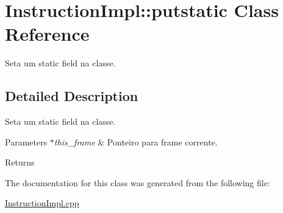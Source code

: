 \hypertarget{class_instruction_impl_1_1putstatic}{}\section{Instruction\+Impl\+:\+:putstatic Class Reference}
\label{class_instruction_impl_1_1putstatic}


Seta um static field na classe.  




\subsection{Detailed Description}
Seta um static field na classe. 


\begin{DoxyParams}{Parameters}
{\em $\ast$this\+\_\+frame} & Ponteiro para frame corrente. \\
\hline
\end{DoxyParams}
\begin{DoxyReturn}{Returns}

\end{DoxyReturn}


The documentation for this class was generated from the following file\+:\begin{DoxyCompactItemize}
\item 
\hyperlink{_instruction_impl_8cpp}{Instruction\+Impl.\+cpp}\end{DoxyCompactItemize}
